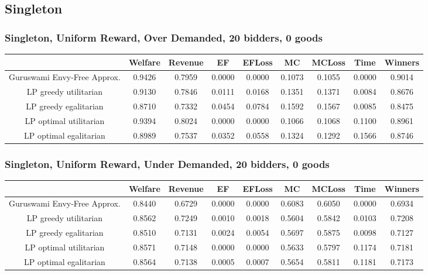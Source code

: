 \subsection{Singleton}
\subsubsection*{Singleton, Uniform Reward, Over Demanded, 20 bidders, 0 goods} 
\begin{tabular}{|c|c|c|c|c|c|c|c|c|}\hline
                            	&Welfare	&Revenue	&EF	&EFLoss	&MC	&MCLoss	&Time	&Winners	\\\hline
   Guruswami Envy-Free Approx.	&0.9426	&0.7959	&0.0000	&0.0000	&0.1073	&0.1055	&0.0000	&0.9014	\\\hline 
         LP greedy utilitarian	&0.9130	&0.7846	&0.0111	&0.0168	&0.1351	&0.1371	&0.0084	&0.8676	\\\hline 
         LP greedy egalitarian	&0.8710	&0.7332	&0.0454	&0.0784	&0.1592	&0.1567	&0.0085	&0.8475	\\\hline 
        LP optimal utilitarian	&0.9394	&0.8024	&0.0000	&0.0000	&0.1066	&0.1068	&0.1100	&0.8961	\\\hline 
        LP optimal egalitarian	&0.8989	&0.7537	&0.0352	&0.0558	&0.1324	&0.1292	&0.1566	&0.8746	\\\hline 
\end{tabular}\subsubsection*{Singleton, Uniform Reward, Under Demanded, 20 bidders, 0 goods} 
\begin{tabular}{|c|c|c|c|c|c|c|c|c|}\hline
                            	&Welfare	&Revenue	&EF	&EFLoss	&MC	&MCLoss	&Time	&Winners	\\\hline
   Guruswami Envy-Free Approx.	&0.8440	&0.6729	&0.0000	&0.0000	&0.6083	&0.6050	&0.0000	&0.6934	\\\hline 
         LP greedy utilitarian	&0.8562	&0.7249	&0.0010	&0.0018	&0.5604	&0.5842	&0.0103	&0.7208	\\\hline 
         LP greedy egalitarian	&0.8510	&0.7131	&0.0024	&0.0054	&0.5697	&0.5875	&0.0098	&0.7127	\\\hline 
        LP optimal utilitarian	&0.8571	&0.7148	&0.0000	&0.0000	&0.5633	&0.5797	&0.1174	&0.7181	\\\hline 
        LP optimal egalitarian	&0.8564	&0.7138	&0.0005	&0.0007	&0.5654	&0.5811	&0.1181	&0.7173	\\\hline 
\end{tabular}\newpage
